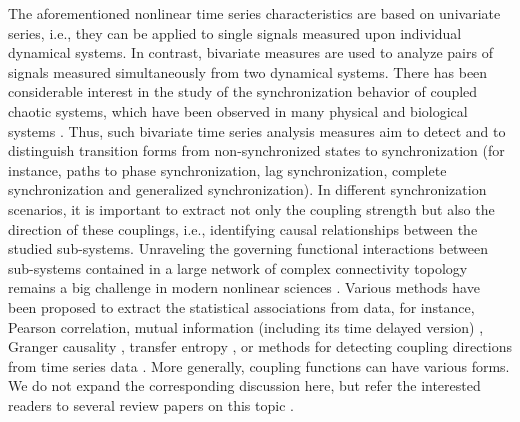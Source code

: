 	The aforementioned nonlinear time series characteristics are based on univariate series, i.e., they can be applied to single signals measured upon individual dynamical systems. In contrast, bivariate measures are used to analyze pairs of signals measured simultaneously from two dynamical systems. There has been considerable interest in the study of the synchronization behavior of coupled chaotic systems, which have been observed in many physical and biological systems \cite{Boccaletti2002,Pikovsky_Kurths_synchr}. Thus, such bivariate time series analysis measures aim to detect and to distinguish transition forms from non-synchronized states to synchronization (for instance, paths to phase synchronization, lag synchronization, complete synchronization and generalized synchronization). In different synchronization scenarios, it is important to extract not only the coupling strength but also the direction of these couplings, i.e., identifying causal relationships between the studied sub-systems. Unraveling the governing functional interactions between sub-systems contained in a large network of complex connectivity topology remains a big challenge in modern nonlinear sciences \cite{Boccaletti2006,Stankovski2017}. Various methods have been proposed to extract the statistical associations from data, for instance, Pearson correlation, mutual information (including its time delayed version) \cite{Frenzel_prl_2007,vejmelka_pre_2008}, Granger causality \cite{Granger_1969,Dhamala_prl2008}, transfer entropy \cite{schreiber_prl2000,runge2012}, or methods for detecting coupling directions from time series data \cite{Quiroga_pre2000,Rosenblum2001,rosenblum_pre2002,smirnov_pre2005,Palus_pre_2007,Romano_pre_2007,bahraminasab_prl2008,Nawrath_prl_2010}. More generally, coupling functions can have various forms. We do not expand the corresponding discussion here, but refer the interested readers to several review papers on this topic \cite{Ding_Book_2007,Hlavackovaschindler2007,Stankovski2017}.

